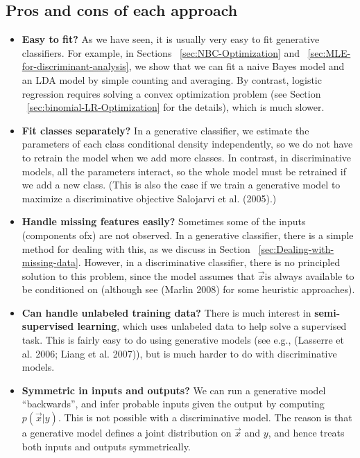 \subsection{Pros and cons of each approach}
\begin{itemize}
\item{\textbf{Easy to fit?} As we have seen, it is usually very easy to fit generative classifiers. For example, in Sections ~\ref{sec:NBC-Optimization} and ~\ref{sec:MLE-for-discriminant-analysis}, we show that we can fit a naive Bayes model and an LDA model by simple counting and averaging. By contrast, logistic regression requires solving a convex optimization problem (see Section ~\ref{sec:binomial-LR-Optimization} for the details), which is much slower.}

\item{\textbf{Fit classes separately?} In a generative classifier, we estimate the parameters of each class conditional density independently, so we do not have to retrain the model when we add more classes. In contrast, in discriminative models, all the parameters interact, so the whole model must be retrained if we add a new class. (This is also the case if we train a generative model to maximize a discriminative objective Salojarvi et al. (2005).)}

\item{\textbf{Handle missing features easily?} Sometimes some of the inputs (components ofx) are not observed. In a generative classifier, there is a simple method for dealing with this, as we discuss in Section ~\ref{sec:Dealing-with-missing-data}. However, in a discriminative classifier, there is no principled solution to this problem, since the model assumes that $\vec{x}$is always available to be conditioned on (although see (Marlin 2008) for some heuristic approaches).}

\item{\textbf{Can handle unlabeled training data?} There is much interest in \textbf{semi-supervised learning}, which uses unlabeled data to help solve a supervised task. This is fairly easy to do using generative models (see e.g., (Lasserre et al. 2006; Liang et al. 2007)), but is much harder to do with discriminative models.}

\item{\textbf{Symmetric in inputs and outputs?} We can run a generative model “backwards”, and infer probable inputs given the output by computing $p(\vec{x}|y)$. This is not possible with a discriminative model. The reason is that a generative model defines a joint distribution on $\vec{x}$ and $y$, and hence treats both inputs and outputs symmetrically.}


\end{itemize}
